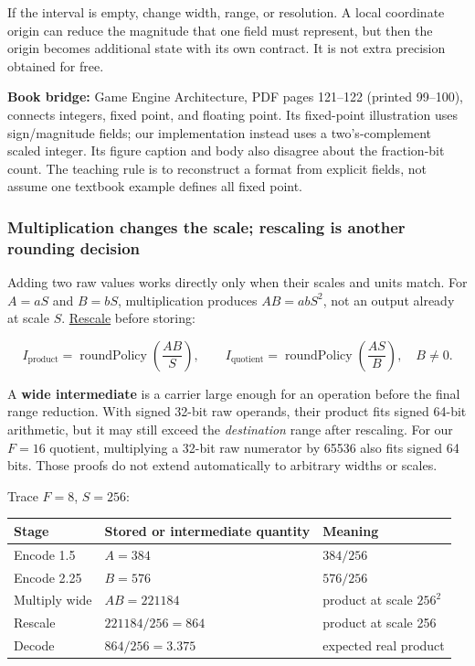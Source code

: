 If the interval is empty, change width, range, or resolution. A local coordinate origin can reduce the magnitude that one field must represent, but then the origin becomes additional state with its own contract. It is not extra precision obtained for free.

\textbf{Book bridge:} Game Engine Architecture, PDF pages 121--122 (printed 99--100), connects integers, fixed point, and floating point. Its fixed-point illustration uses sign/magnitude fields; our implementation instead uses a two's-complement scaled integer. Its figure caption and body also disagree about the fraction-bit count. The teaching rule is to reconstruct a format from explicit fields, not assume one textbook example defines all fixed point.

\subsubsection{Multiplication changes the scale; rescaling is another rounding decision}\label{01-foundations-i-ch001-multiplication-changes-the-scale-rescaling-is-another-rounding-decision}

\hypertarget{01-foundations-i-ch001-multiplication-changes-the-scale-rescaling-is-another-rounding-decision}{}

Adding two raw values works directly only when their scales and units match. For \(A=aS\) and \(B=bS\), multiplication produces \(AB=abS^2\), not an output already at scale \(S\). \hyperref[appendix-3333db47830f]{Rescale} before storing:

\[
I_{\mathrm{product}}=\operatorname{roundPolicy}\!\left(\frac{AB}{S}\right),
\qquad
I_{\mathrm{quotient}}=\operatorname{roundPolicy}\!\left(\frac{AS}{B}\right),\quad B\ne0.
\]

A \textbf{wide intermediate} is a carrier large enough for an operation before the final range reduction. With signed 32-bit raw operands, their product fits signed 64-bit arithmetic, but it may still exceed the \emph{destination} range after rescaling. For our \(F=16\) quotient, multiplying a 32-bit raw numerator by 65536 also fits signed 64 bits. Those proofs do not extend automatically to arbitrary widths or scales.

Trace \(F=8\), \(S=256\):

{\def\LTcaptype{none} %
\begin{longtable}[]{@{}lll@{}}
\toprule\noalign{}
Stage & Stored or intermediate quantity & Meaning \\
\midrule\noalign{}
\endhead
\bottomrule\noalign{}
\endlastfoot
Encode 1.5 & \(A=384\) & \(384/256\) \\
Encode 2.25 & \(B=576\) & \(576/256\) \\
Multiply wide & \(AB=221184\) & product at scale \(256^2\) \\
Rescale & \(221184/256=864\) & product at scale 256 \\
Decode & \(864/256=3.375\) & expected real product \\
\end{longtable}
}

